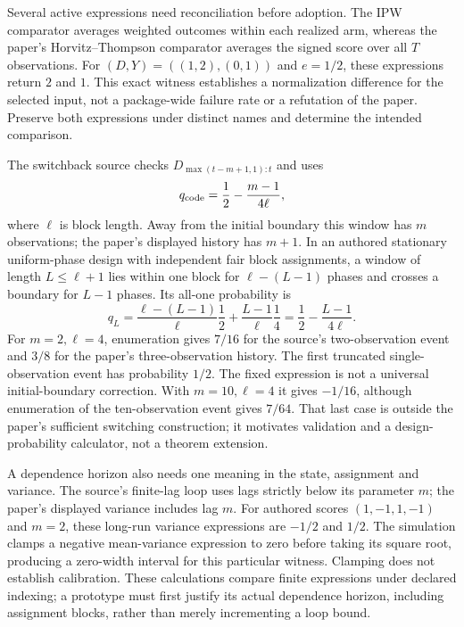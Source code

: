 Several active expressions need reconciliation before adoption. The IPW
comparator averages weighted outcomes within each realized arm, whereas the
paper's Horvitz--Thompson comparator averages the signed score over all $T$
observations. For $(D,Y)=((1,2),(0,1))$ and $e=1/2$, these expressions return
$2$ and $1$. This exact witness establishes a normalization difference for
the selected input, not a package-wide failure rate or a refutation of the
paper. Preserve both expressions under distinct names and determine the
intended comparison.\citep{exec25_onet_dml,exec25_onet_paper,exec25_onet_choice}

The switchback source checks $D_{\max(t-m+1,1):t}$ and uses
\[
 q_{\rm code}=\frac12-\frac{m-1}{4\ell},
\]
where $\ell$ is block length. Away from the initial boundary this window has
$m$ observations; the paper's displayed history has $m+1$. In an authored
stationary uniform-phase design with independent fair block assignments, a
window of length $L\leq\ell+1$ lies within one block for $\ell-(L-1)$ phases
and crosses a boundary for $L-1$ phases. Its all-one probability is
\[
 q_L=\frac{\ell-(L-1)}{\ell}\frac12+
       \frac{L-1}{\ell}\frac14
     =\frac12-\frac{L-1}{4\ell}.
\]
For $m=2,\ell=4$, enumeration gives $7/16$ for the source's two-observation
event and $3/8$ for the paper's three-observation history. The first truncated
single-observation event has probability $1/2$. The fixed expression is not
a universal initial-boundary correction. With $m=10,\ell=4$ it gives
$-1/16$, although enumeration of the ten-observation event gives $7/64$.
That last case is outside the paper's sufficient switching construction; it
motivates validation and a design-probability calculator, not a theorem
extension.\citep{exec25_onet_dml,exec25_onet_paper,exec25_onet_choice}

A dependence horizon also needs one meaning in the state, assignment and
variance. The source's finite-lag loop uses lags strictly below its parameter
$m$; the paper's displayed variance includes lag $m$. For authored scores
$(1,-1,1,-1)$ and $m=2$, these long-run variance expressions are $-1/2$ and
$1/2$. The simulation clamps a negative mean-variance expression to zero
before taking its square root, producing a zero-width interval for this
particular witness. Clamping does not establish calibration. These calculations
compare finite expressions under declared indexing; a prototype must first
justify its actual dependence horizon, including assignment blocks, rather
than merely incrementing a loop bound.
\citep{exec25_onet_dml,exec25_onet_paper,exec25_onet_choice}

